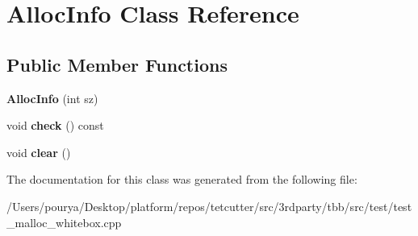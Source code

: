 \hypertarget{classAllocInfo}{}\section{Alloc\+Info Class Reference}
\label{classAllocInfo}
\subsection*{Public Member Functions}
\begin{DoxyCompactItemize}
\item 
\hypertarget{classAllocInfo_a39724e5e19d90db93778f6a6e17661a1}{}{\bfseries Alloc\+Info} (int sz)\label{classAllocInfo_a39724e5e19d90db93778f6a6e17661a1}

\item 
\hypertarget{classAllocInfo_a1891d53db7f3d7895d37f1ef2bb1b92e}{}void {\bfseries check} () const \label{classAllocInfo_a1891d53db7f3d7895d37f1ef2bb1b92e}

\item 
\hypertarget{classAllocInfo_a47ff41a7cdd90ad59f63b5758f95689d}{}void {\bfseries clear} ()\label{classAllocInfo_a47ff41a7cdd90ad59f63b5758f95689d}

\end{DoxyCompactItemize}


The documentation for this class was generated from the following file\+:\begin{DoxyCompactItemize}
\item 
/\+Users/pourya/\+Desktop/platform/repos/tetcutter/src/3rdparty/tbb/src/test/test\+\_\+malloc\+\_\+whitebox.\+cpp\end{DoxyCompactItemize}
